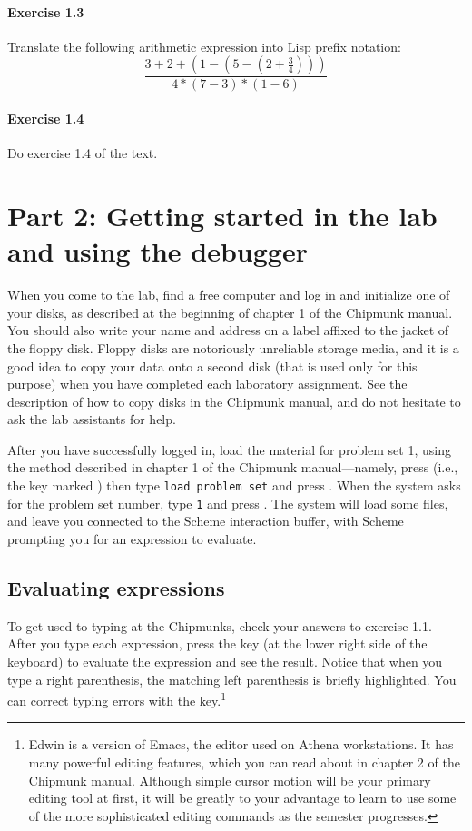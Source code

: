 \paragraph{Exercise 1.3}
Translate the following arithmetic expression into Lisp prefix notation:
\begin{displaymath}
\frac{3+2+(1-(5-(2+\frac{3}{4})))}{4*(7-3)*(1-6)}
\end{displaymath}

\paragraph{Exercise 1.4}
Do exercise 1.4 of the text.


\section{Part 2: Getting started in the lab and using the debugger}

When you come to the lab, find a free computer and log in and
initialize one of your disks, as described at the beginning of chapter
1 of the Chipmunk manual.  You should also write your name and address
on a label affixed to the jacket of the floppy disk.  Floppy disks are
notoriously unreliable storage media, and it is a good idea to copy
your data onto a second disk (that is used only for this purpose) when
you have completed each laboratory assignment.  See the description of
how to copy disks in the Chipmunk manual, and do not hesitate to ask
the lab assistants for help.

After you have successfully logged in, load the material for problem
set 1, using the method described in chapter 1 of the Chipmunk
manual---namely, press  (i.e., the key marked
) then type {\tt load problem set} and press .
When the system asks for the problem set number, type {\tt 1} and
press .  The system will load some files, and leave you
connected to the Scheme interaction buffer, with Scheme prompting you
for an expression to evaluate.

\subsection{Evaluating expressions} 

To get used to typing at the Chipmunks, check your answers to exercise
1.1.  After you type each expression, press the  key (at
the lower right side of the keyboard) to evaluate the expression and
see the result.  Notice that when you type a right parenthesis, the
matching left parenthesis is briefly highlighted.  You can correct
typing errors with the  key.\footnote{Edwin is a
version of Emacs, the editor used on Athena workstations.  It has many
powerful editing features, which you can read about in chapter 2 of
the Chipmunk manual.  Although simple cursor motion will be your
primary editing tool at first, it will be greatly to your advantage to
learn to use some of the more sophisticated editing commands as the
semester progresses.}

